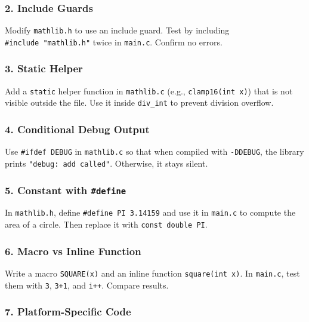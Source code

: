 \documentclass[
  letterpaper,
  DIV=11,
  numbers=noendperiod]{scrreprt}
\begin{document}
\subsubsection{2. Include Guards}\label{include-guards-2}

Modify \texttt{mathlib.h} to use an include guard. Test by including
\texttt{\#include\ "mathlib.h"} twice in \texttt{main.c}. Confirm no
errors.

\subsubsection{3. Static Helper}\label{static-helper}

Add a \texttt{static} helper function in \texttt{mathlib.c} (e.g.,
\texttt{clamp16(int\ x)}) that is not visible outside the file. Use it
inside \texttt{div\_int} to prevent division overflow.

\subsubsection{4. Conditional Debug
Output}\label{conditional-debug-output}

Use \texttt{\#ifdef\ DEBUG} in \texttt{mathlib.c} so that when compiled
with \texttt{-DDEBUG}, the library prints
\texttt{"debug:\ add\ called"}. Otherwise, it stays silent.

\subsubsection{\texorpdfstring{5. Constant with
\texttt{\#define}}{5. Constant with \#define}}\label{constant-with-define}

In \texttt{mathlib.h}, define \texttt{\#define\ PI\ 3.14159} and use it
in \texttt{main.c} to compute the area of a circle. Then replace it with
\texttt{const\ double\ PI}.

\subsubsection{6. Macro vs Inline
Function}\label{macro-vs-inline-function}

Write a macro \texttt{SQUARE(x)} and an inline function
\texttt{square(int\ x)}. In \texttt{main.c}, test them with \texttt{3},
\texttt{3+1}, and \texttt{i++}. Compare results.

\subsubsection{7. Platform-Specific Code}\label{platform-specific-code}
\end{document}
